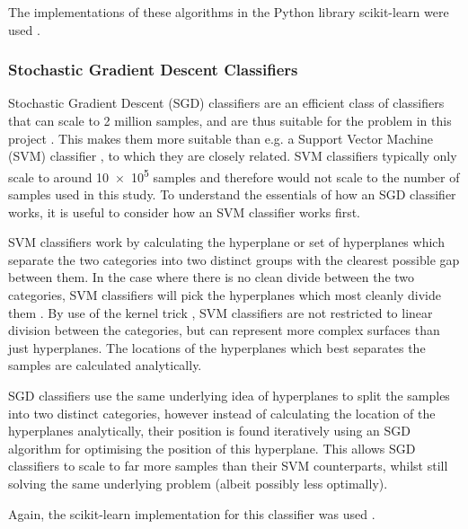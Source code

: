 \documentclass[pdftex,12pt,a4paper]{report}
\begin{document}
The implementations of these algorithms in the Python library scikit-learn were used
\parencite{scikitLearn2011}.

\subsubsection{Stochastic Gradient Descent Classifiers}
Stochastic Gradient Descent (SGD) classifiers are an efficient class of classifiers that can scale
to 2 million samples, and are thus suitable for the problem in this project
\parencite{shalevshwartz07pegasos, bottou2008tradeoffs}. This makes them more suitable than e.g. a Support
Vector Machine (SVM) classifier \parencite{cortes1995support}, to which they are closely related.
SVM classifiers typically only scale to around \SI{10e5}{} samples and therefore would not scale to
the number of samples used in this study. To understand the essentials of how an SGD classifier
works, it is useful to consider how an SVM classifier works first.

SVM classifiers work by calculating the hyperplane or set of hyperplanes which separate the two
categories into two distinct groups with the clearest possible gap between them. In the case where
there is no clean divide between the two categories, SVM classifiers will pick the hyperplanes which
most cleanly divide them \parencite{cortes1995support}. By use of the kernel trick
\parencite{aizerman1964theoretical}, SVM classifiers are not restricted to linear division between
the categories, but can represent more complex surfaces than just hyperplanes. The locations of the
hyperplanes which best separates the samples are calculated analytically.

SGD classifiers use the same underlying idea of hyperplanes to split the samples into two distinct
categories, however instead of calculating the location of the hyperplanes analytically, their
position is found iteratively using an SGD algorithm for optimising the position of this hyperplane.
This allows SGD classifiers to scale to far more samples than their SVM counterparts, whilst still
solving the same underlying problem (albeit possibly less optimally).

Again, the scikit-learn implementation for this classifier was used \parencite{scikitLearn2011}.

\end{document}

